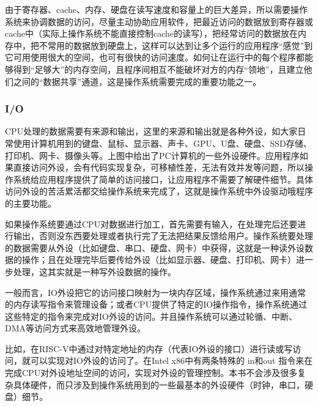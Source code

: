 由于寄存器、cache、内存、硬盘在读写速度和容量上的巨大差异，所以需要操作系统来协调数据的访问，尽量主动协助应用软件，把最近访问的数据放到寄存器或cache中（实际上操作系统不能直接控制cache的读写），把经常访问的数据放在内存中，把不常用的数据放到硬盘上，这样可以达到让多个运行的应用程序“感觉”到它可用使用很大的空间，也可有很快的访问速度。如何让在运行中的每个程序都能够得到“足够大”的内存空间，且程序间相互不能破坏对方的内存“领地”，且建立他们之间的“数据共享”通道，这是操作系统需要完成的重要功能之一。

\subsubsection{I/O}


CPU处理的数据需要有来源和输出，这里的来源和输出就是各种外设，如大家日常使用计算机用到的键盘、鼠标、显示器、声卡、GPU、U盘、硬盘、SSD存储、打印机、网卡、摄像头等。上图中给出了PC计算机的一些外设硬件。应用程序如果直接访问外设，会有代码实现复杂，可移植性差，无法有效并发等问题，所以操作系统给应用程序提供了简单的访问接口，让应用程序不需要了解硬件细节。具体访问外设的苦活累活都交给操作系统来完成了，这就是操作系统中外设驱动哦程序的主要功能。

如果操作系统要通过CPU对数据进行加工，首先需要有输入，在处理完后还要进行输出，否则没东西要处理或者执行完了无法把结果反馈给用户。操作系统要处理的数据需要从外设（比如键盘、串口、硬盘、网卡）中获得，这就是一种读外设数据的操作；且在处理完毕后要传给外设（比如显示器、硬盘、打印机、网卡）进一步处理，这其实就是一种写外设数据的操作。

一般而言，IO外设把它的访问接口映射为一块内存区域，操作系统通过来用通常的内存读写指令来管理设备；或者CPU提供了特定的IO操作指令，操作系统通过这些特定的指令来完成对IO外设的访问。并且操作系统可以通过轮循、中断、DMA等访问方式来高效地管理外设。

比如，在RISC-V中通过对特定地址的内存（代表IO外设的接口）进行读或写访问，就可以实现对IO外设的访问了。在Intel x86中有两条特殊的 in和out 指令来在完成CPU对外设地址空间的访问，实现对外设的管理控制。本书不会涉及很多复杂具体硬件，而只涉及到操作系统用到的一些最基本的外设硬件（时钟，串口，硬盘）细节。



